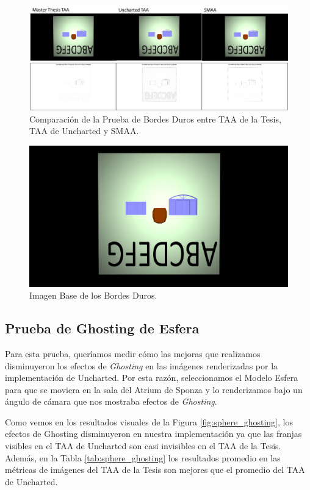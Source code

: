 \documentclass[pregrado]{tesis-usb} %
\begin{document}
\begin{figure}[!htb]
	\centering
	\includegraphics[scale=0.9]{images/results/hard_test.png}
	\caption{Comparación de la Prueba de Bordes Duros entre TAA de la Tesis, TAA de Uncharted y SMAA.}\label{fig:hard_test_render}
\end{figure}

\begin{figure}[!htb]
	\centering
	\includegraphics[scale=0.09]{images/results/hard_test_sobel_ground_truth.png}
	\caption{Imagen Base de los Bordes Duros.}\label{fig:hard_test_truth}
\end{figure}

\FloatBarrier

\subsection{Prueba de Ghosting de Esfera}
Para esta prueba, queríamos medir cómo las mejoras que realizamos disminuyeron los efectos de \textit{Ghosting} en las imágenes renderizadas por la implementación de Uncharted. Por esta razón, seleccionamos el Modelo Esfera para que se moviera en la sala del Atrium de Sponza y lo renderizamos bajo un ángulo de cámara que nos mostraba efectos de \textit{Ghosting}.

Como vemos en los resultados visuales de la Figura \ref{fig:sphere_ghosting}, los efectos de  Ghosting disminuyeron en nuestra implementación ya que las franjas visibles en el TAA de Uncharted son casi invisibles en el TAA de la Tesis. Además, en la Tabla \ref{tab:sphere_ghosting} los resultados promedio en las métricas de imágenes del TAA de la Tesis son mejores que el promedio del TAA de Uncharted.
\end{document}
